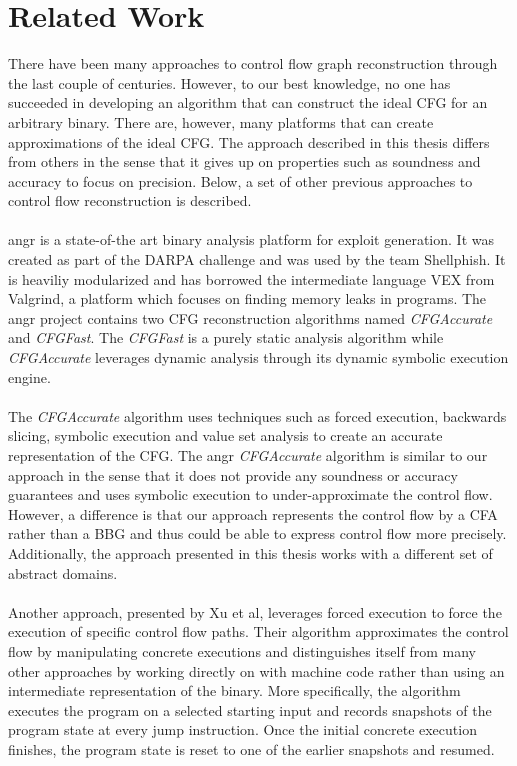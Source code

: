 \documentclass{kththesis}
\newcommand{\fbcomment}[1]{{#1}}
\renewcommand{\fbcomment}[1]{}
\renewcommand{\it}[1]{\textit{#1}}
\begin{document}
\section{Related Work}
\fbcomment{\color{red}Goal:Describe what has and has not been done in related work. Also, how the earlier work relates to what has been done in this thesis}
There have been many approaches to control flow graph reconstruction through the last couple of centuries. However, to our best knowledge, no one has succeeded in developing an algorithm that can construct the ideal CFG for an arbitrary binary. There are, however, many platforms that can create approximations of the ideal CFG. The approach described in this thesis differs from others in the sense that it gives up on properties such as soundness and accuracy to focus on precision. Below, a set of other previous approaches to control flow reconstruction is described.
\\ \\
angr\cite{angr} is a state-of-the art binary analysis platform for exploit generation. It was created as part of the DARPA challenge and was used by the team Shellphish. It is heaviliy modularized and has borrowed the intermediate language VEX from Valgrind, a platform which focuses on finding memory leaks in programs. The angr project contains two CFG reconstruction algorithms named \textit{CFGAccurate} and \textit{CFGFast}. The \textit{CFGFast} is a purely static analysis algorithm while \textit{CFGAccurate} leverages dynamic analysis through its dynamic symbolic execution engine. 
\\ \\
The \textit{CFGAccurate} algorithm uses techniques such as forced execution, backwards slicing, symbolic execution and value set analysis to create an accurate representation of the CFG. The angr \it{CFGAccurate} algorithm is similar to our approach in the sense that it does not provide any soundness or accuracy guarantees and uses symbolic execution to under-approximate the control flow. However, a difference is that our approach represents the control flow by a CFA rather than a BBG and thus could be able to express control flow more precisely. Additionally, the approach presented in this thesis works with a different set of abstract domains.
\\ \\
Another approach, presented by Xu et al\cite{preciseCFG}, leverages forced execution to force the execution of specific control flow paths. Their algorithm approximates the control flow by manipulating concrete executions and distinguishes itself from many other approaches by working directly on with machine code rather than using an intermediate representation of the binary. More specifically, the algorithm executes the program on a selected starting input and records snapshots of the program state at every jump instruction. Once the initial concrete execution finishes, the program state is reset to one of the earlier snapshots and resumed. 
\end{document}
